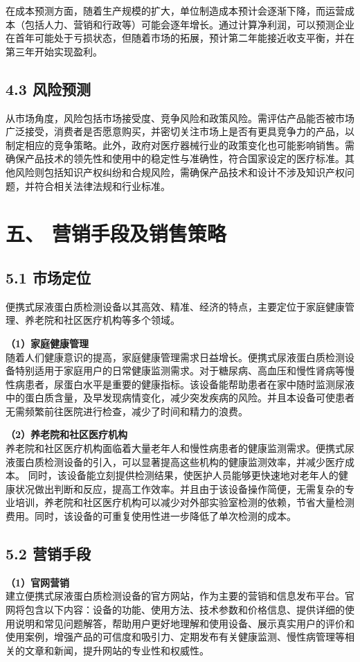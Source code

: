 \documentclass[a4paper,12pt]{article}
\begin{document}
在成本预测方面，随着生产规模的扩大，单位制造成本预计会逐渐下降，而运营成本（包括人力、营销和行政等）可能会逐年增长。通过计算净利润，可以预测企业在首年可能处于亏损状态，但随着市场的拓展，预计第二年能接近收支平衡，并在第三年开始实现盈利。

\subsection*{4.3 风险预测}
从市场角度，风险包括市场接受度、竞争风险和政策风险。需评估产品能否被市场广泛接受，消费者是否愿意购买，并密切关注市场上是否有更具竞争力的产品，以制定相应的竞争策略。此外，政府对医疗器械行业的政策变化也可能影响销售。需确保产品技术的领先性和使用中的稳定性与准确性，符合国家设定的医疗标准。其他风险则包括知识产权纠纷和合规风险，需确保产品技术和设计不涉及知识产权问题，并符合相关法律法规和行业标准。

\section*{五、 营销手段及销售策略}
\subsection*{5.1 市场定位}
便携式尿液蛋白质检测设备以其高效、精准、经济的特点，主要定位于家庭健康管理、养老院和社区医疗机构等多个领域。

\textbf{（1）家庭健康管理}\\
随着人们健康意识的提高，家庭健康管理需求日益增长。便携式尿液蛋白质检测设备特别适用于家庭用户的日常健康监测需求。对于糖尿病、高血压和慢性肾病等慢性病患者，尿蛋白水平是重要的健康指标。该设备能帮助患者在家中随时监测尿液中的蛋白质含量，及早发现病情变化，减少突发疾病的风险。并且本设备可使患者无需频繁前往医院进行检查，减少了时间和精力的浪费。

\textbf{（2）养老院和社区医疗机构}\\
养老院和社区医疗机构面临着大量老年人和慢性病患者的健康监测需求。便携式尿液蛋白质检测设备的引入，可以显著提高这些机构的健康监测效率，并减少医疗成本。
同时，该设备能立刻提供检测结果，使医护人员能够更快速地对老年人的健康状况做出判断和反应，提高工作效率。并且由于该设备操作简便，无需复杂的专业培训，养老院和社区医疗机构可以减少对外部实验室检测的依赖，节省大量检测费用。同时，该设备的可重复使用性进一步降低了单次检测的成本。

\subsection*{5.2 营销手段}
\textbf{（1）官网营销}\\
建立便携式尿液蛋白质检测设备的官方网站，作为主要的营销和信息发布平台。官网将包含以下内容：设备的功能、使用方法、技术参数和价格信息、提供详细的使用说明和常见问题解答，帮助用户更好地理解和使用设备、展示真实用户的评价和使用案例，增强产品的可信度和吸引力、定期发布有关健康监测、慢性病管理等相关的文章和新闻，提升网站的专业性和权威性。
\end{document}
